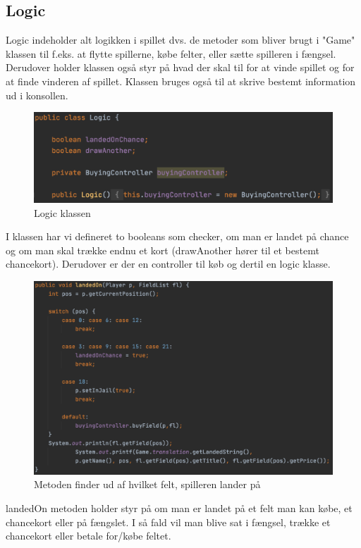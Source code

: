 \subsection{Logic}
Logic indeholder alt logikken i spillet dvs. de metoder som bliver brugt i "Game" klassen til f.eks. at flytte spillerne, købe felter, eller sætte spilleren i fængsel. Derudover holder klassen også styr på hvad der skal til for at vinde spillet og for at finde vinderen af spillet. Klassen bruges også til at skrive bestemt information ud i konsollen. 


\begin{figure}[H]
    \centering
    \includegraphics{sources/7_implementering/LogicClass.png}
    \caption{Logic klassen}
    \label{fig:logicClass}
\end{figure}
I klassen har vi defineret to booleans som checker, om man er landet på chance og om man skal trække endnu et kort (drawAnother hører til et bestemt chancekort). Derudover er der en controller til køb og dertil en logic klasse.

\begin{figure}[H]
    \centering
    \includegraphics{sources/7_implementering/LogiclandedOn.png}
    \caption{Metoden finder ud af hvilket felt, spilleren lander på}
    \label{fig:logicLandedOn}
\end{figure}
landedOn metoden holder styr på om man er landet på et felt man kan købe, et chancekort eller på fængslet. I så fald vil man blive sat i fængsel, trække et chancekort eller betale for/købe feltet. 



